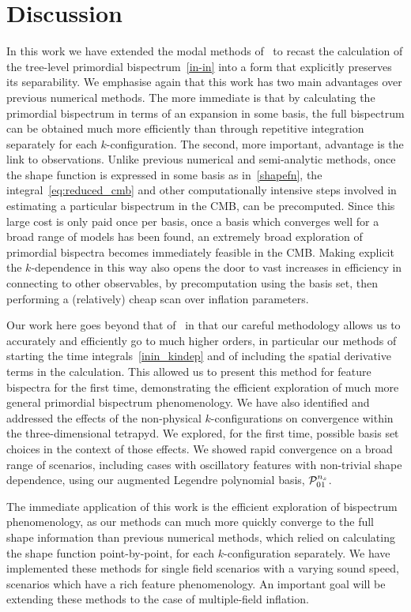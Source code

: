 \section{Discussion}
In this work we have extended the modal methods of~\cite{FergShell_1,FergShell_2,FergShell_3}
to recast the calculation of the tree-level primordial bispectrum~\eqref{in-in}
into a form that explicitly preserves its separability.
We emphasise again that this work has two main advantages over previous
numerical methods. The more immediate is that by calculating the primordial
bispectrum in terms of an expansion in some basis, the full bispectrum can
be obtained much more efficiently than through repetitive integration
separately for each $k$-configuration. The second, more important, advantage
is the link to observations.
Unlike previous numerical and semi-analytic methods,
once the shape function is expressed in some basis
as in~\eqref{shapefn},
the integral~\eqref{eq:reduced_cmb} and other computationally intensive steps involved
in estimating a particular bispectrum in the CMB, can be precomputed. Since this
large cost is only paid once per basis, once a basis
which converges well for a broad range of models
has been found, an extremely broad exploration of primordial bispectra becomes immediately feasible in the CMB.
Making explicit the $k$-dependence in this way also opens the door to vast increases in efficiency in
connecting to other observables, by precomputation using the basis set, then performing a (relatively) cheap
scan over inflation parameters.


Our work here goes beyond that of~\cite{Funakoshi} in that our careful methodology
allows us to accurately and efficiently go to much higher orders,
in particular our methods of starting the time integrals~\eqref{inin_kindep}
and of including the spatial derivative terms in the calculation.
This allowed us to present this method for feature bispectra for the first time,
demonstrating the efficient exploration of much more general primordial bispectrum phenomenology.
We have also identified and addressed the effects
of the non-physical $k$-configurations on convergence within the three-dimensional tetrapyd.
We explored, for the first time, possible basis set choices in the context
of those effects.
We showed rapid convergence on a broad range of scenarios,
including cases with oscillatory features with non-trivial shape dependence,
using our augmented Legendre polynomial basis, $\mathcal{P}^{n_s}_{01}$.

The immediate application of this work is the efficient exploration of
bispectrum phenomenology, as our methods can much more quickly
converge to the full shape information than previous numerical methods,
which relied on calculating the shape function point-by-point, for each $k$-configuration separately.
We have implemented these methods for single field scenarios
with a varying sound speed, scenarios which
have a rich feature phenomenology. An important goal will be extending
these methods to the case of multiple-field inflation.

